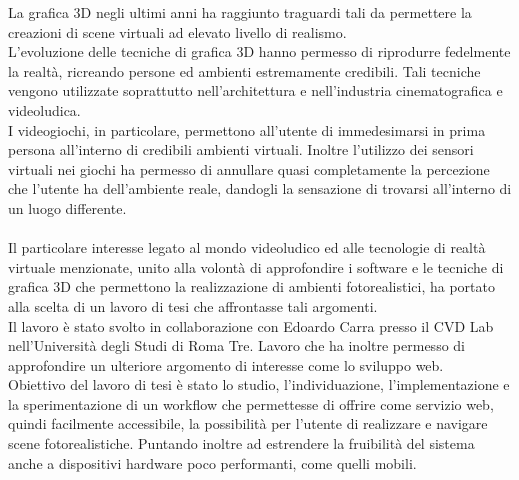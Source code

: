 La grafica 3D negli ultimi anni ha raggiunto traguardi tali da permettere la creazioni di scene virtuali ad elevato livello di realismo.
\\
L’evoluzione delle tecniche di grafica 3D hanno permesso di riprodurre fedelmente la realtà, ricreando persone ed ambienti estremamente credibili. Tali tecniche vengono utilizzate soprattutto nell’architettura e nell’industria cinematografica e videoludica.
\\
I videogiochi, in particolare, permettono all’utente di immedesimarsi in prima persona all’interno di credibili ambienti virtuali. Inoltre l’utilizzo dei sensori virtuali nei giochi ha permesso di annullare quasi completamente la percezione che l’utente ha dell’ambiente reale, dandogli la sensazione di trovarsi all’interno di un luogo differente.
\\
\\
Il particolare interesse legato al mondo videoludico ed alle tecnologie di realtà virtuale menzionate, unito alla volontà di approfondire i software e le tecniche di grafica 3D che permettono la realizzazione di ambienti fotorealistici, ha portato alla scelta di un lavoro di tesi che affrontasse tali argomenti.
\\
Il lavoro è stato svolto in collaborazione con Edoardo Carra presso il CVD Lab nell’Università degli Studi di Roma Tre. Lavoro che ha inoltre permesso di approfondire un ulteriore argomento di interesse come lo sviluppo web.
\\
Obiettivo del lavoro di tesi è stato lo studio, l'individuazione, l'implementazione e la sperimentazione di un workflow che permettesse di offrire come servizio web, quindi facilmente accessibile, la possibilità per l'utente di realizzare e navigare scene fotorealistiche. Puntando inoltre ad estrendere la fruibilità del sistema anche a dispositivi hardware poco performanti, come quelli mobili.
